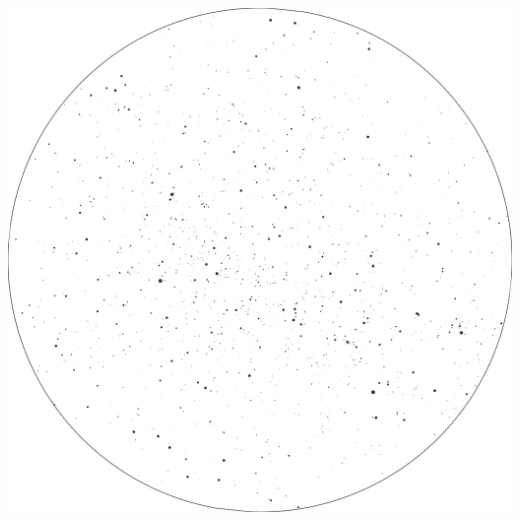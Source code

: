 \documentclass{./SAS-class-skygen}
\begin{document}
	\vspace{0.5cm}
    \begin{center}
    \includegraphics[width=\textwidth]{./pics/skychart12.png}
    \end{center}
    
    
\end{document}
